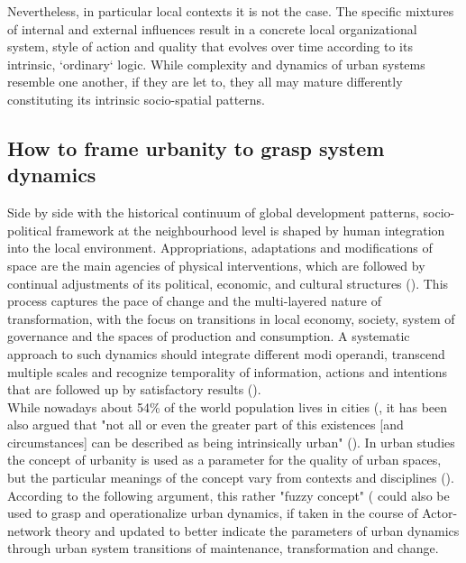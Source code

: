 \documentclass[11pt]{report}
\begin{document}
Nevertheless, in particular local contexts it is not the case. The specific mixtures of internal and external influences result in a concrete local organizational system, style of action and quality that evolves over time according to its intrinsic, `ordinary` logic.
While complexity and dynamics of urban systems resemble one another, if they are let to, they all may mature differently constituting its intrinsic socio-spatial patterns.

\subsection{How to frame urbanity to grasp system dynamics}

Side by side with the historical continuum of global development patterns, socio-political framework at the neighbourhood level is shaped by human integration into the local environment.
Appropriations, adaptations and modifications of space are the main agencies of physical interventions, which are followed by continual adjustments of its political, economic, and cultural structures (\href{Sykola}{\citealt{Sykora 1999}}).
This process captures the pace of change and the multi-layered nature of transformation, with the focus on transitions in local economy, society, system of governance and the spaces of production and consumption.
A systematic approach to such dynamics should integrate different modi operandi, transcend multiple scales and recognize temporality of information, actions and intentions that are followed up by satisfactory results (\href{Tardin}{\citealt{Tardin 2014}}).
\\

While nowadays about 54\% of the world population lives in cities (\href{UN}{\citealt{_world_2016}}, it has been also argued that "not all or even the greater part of this existences [and circumstances] can be described as being intrinsically urban"
(\href{Scott}{\citealt{scott_xxx_2015}}).
In urban studies the concept of urbanity is used as a parameter for the quality of urban spaces, but the particular meanings of the concept vary from contexts and disciplines (\citealt{(Bisson 2016}).
According to the following argument, this rather "fuzzy concept" (\cite{Bourdin, 2010} could also be used to grasp and operationalize urban dynamics, if taken in the course of Actor-network theory and updated to better indicate the parameters of urban dynamics through urban system transitions of maintenance, transformation and change.
\\
\end{document}
